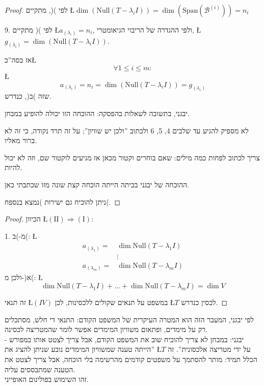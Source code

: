 \documentclass[english,hebrew]{article}
\begin{document}
\begin{proof}
לפי ){\endL}(, מתקיים \L{$\dim\left(\text{Null}(T-\lambda_{i}I)\right)=\dim\left(\text{Span}\left(\mathcal{B}^{(i)}\right)\right)=n_{i}$}

9. לפי ){\endL}( מתקיים \L{$a_{(\lambda_{i})}=n_{i}$}, ולפי
ההגדרה של הריבוי הגיאומטרי, \L{$g_{(\lambda_{i})}=\dim\left(\text{Null}(T-\lambda_{i}I)\right)$}.

אז בסה\textquotedblright כ\L{%
\[
\forall1\le i\le m:
\]
}%
\L{%
\[
a_{(\lambda_{i})}=n_{i}=\dim\left(\text{Null}(T-\lambda_{i}I)\right)=g_{(\lambda_{i})}
\]
}%
שזה )ב(, כנדרש.

יבגני, בתשובה לשאלות בהפסקה: ההוכחה הזו יכולה להופיע במבחן.

לא מספיק להגיע עד שלבים 4, 5, 6 ולכתוב \textquotedblright ולכן יש
שוויון\textquotedblright ; על זה תרד נקודה, כי זה לא ברור מאליו.

צריך לכתוב לפחות כמה מילים: שאם בוחרים וקטור מכאן אז מגיעים לוקטור
שם, וזה לא יכול להיות.

ההוכחה של יבגני בכיתה הייתה הוכחה קצת שונה מזו שכתבתי כאן.

ניתן להוכיח גם ישירות )נמצא בנספח(.
\end{proof}
\begin{proof}
הכיוון \L{$(\text{II})\Rightarrow(\text{I})$}:

1. מ-)ב(: \L{%
\begin{align*}
a_{\left(\lambda_{1}\right)}= & \dim\text{Null}(T-\lambda_{1}I)\\
 & \vdots\\
a_{\left(\lambda_{m}\right)}= & \dim\text{Null}(T-\lambda_{m}I)
\end{align*}
}%
ולכן מ-)א(: \L{%
\[
\dim\text{Null}(T-\lambda_{1}I)+\dots+\dim\text{Null}(T-\lambda_{m}I)=\dim V
\]
}%

זה תנאי \L{$\left(IV\right)$} במשפט על תנאים שקולים ללכסינות, לכן
\L{$T$} לכסין כנדרש.
\end{proof}
לפי יבגני, המעבר הזה הוא המטרה העיקרית של המשפט הקודם: התנאי די חלש,
מסתכלים רק על מימדים, ופתאום משוויון המימדים אפשר לומר שהמטריצה לכסינה.\\

יבגני: במבחן לא צריך להוכיח שוב את המשפט הקודם, אבל צריך לצטט אותו
במפורש {\beginL -\endL} \textquotedblright הייתה טענה שמשוויון המימדים
נובע שניתן להציג את \L{$T$} על ידי מטריצה אלכסונית\textquotedblright .
זה הכלל תמיד: מותר להסתמך על משפטים קודמים מהרשימה בלי הוכחה, אבל
צריך לצטט את הטענה שמתבססים עליה.\\

זהו השימוש בפולינום האופייני.
\end{document}
